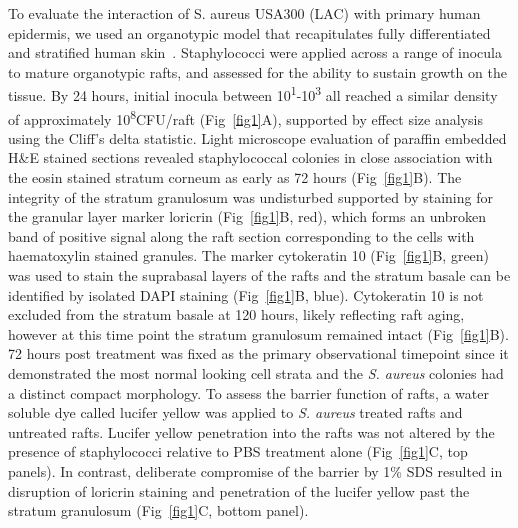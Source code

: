 \documentclass[10pt,letterpaper]{article}
\begin{document}
To evaluate the interaction of S. aureus USA300 (LAC) with primary human epidermis, we used an organotypic model that recapitulates fully differentiated and stratified human skin~\cite{simpson_rna_2010}.
Staphylococci were applied across a range of inocula to mature organotypic rafts, and assessed for the ability to sustain growth on the tissue.
By 24 hours, initial inocula between 10\textsuperscript{1}-10\textsuperscript{3} all reached a similar density of approximately 10\textsuperscript{8}CFU/raft (Fig~\ref{fig1}A), supported by effect size analysis using the Cliff's delta statistic.
Light microscope evaluation of paraffin embedded H\&E stained sections revealed staphylococcal colonies in close association with the eosin stained stratum corneum as early as 72 hours (Fig~\ref{fig1}B).
The integrity of the stratum granulosum was undisturbed supported by staining for the granular layer marker loricrin (Fig~\ref{fig1}B, red), which forms an unbroken band of positive signal along the raft section corresponding to the cells with haematoxylin stained granules.
The marker cytokeratin 10 (Fig~\ref{fig1}B, green) was used to stain the suprabasal layers of the rafts and the stratum basale can be identified by isolated DAPI staining (Fig~\ref{fig1}B, blue).
Cytokeratin 10 is not excluded from the stratum basale at 120 hours, likely reflecting raft aging, however at this time point the stratum granulosum remained intact (Fig~\ref{fig1}B).
72 hours post treatment was fixed as the primary observational timepoint since it demonstrated the most normal looking cell strata and the \textit{S. aureus} colonies had a distinct compact morphology.
To assess the barrier function of rafts, a water soluble dye called lucifer yellow was applied to \textit{S. aureus} treated rafts and untreated rafts.
Lucifer yellow penetration into the rafts was not altered by the presence of staphylococci relative to PBS treatment alone (Fig~\ref{fig1}C, top panels).
In contrast, deliberate compromise of the barrier by 1\% SDS resulted in disruption of loricrin staining and penetration of the lucifer yellow past the stratum granulosum (Fig~\ref{fig1}C, bottom panel).

\end{document}

